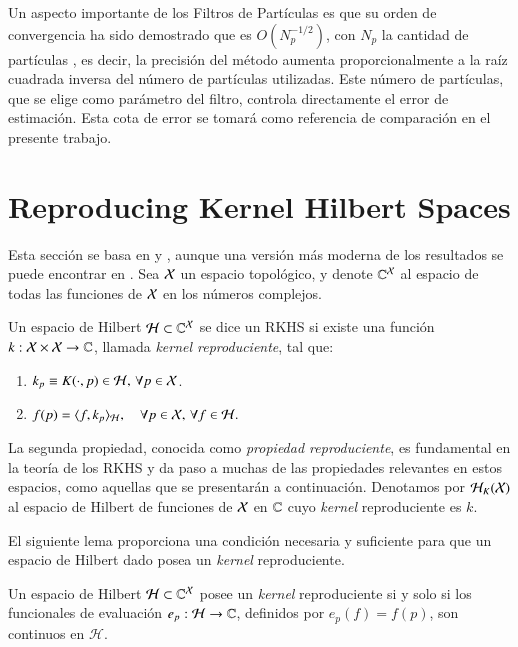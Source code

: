 Un aspecto importante de los Filtros de Partículas es que su orden de convergencia ha sido demostrado que es $O(N_p^{-1/2})$, con $N_p$ la cantidad de partículas \cite{Crisan2002APractitioners, Chopin2020AnCarlo}, es decir, la precisión del método aumenta proporcionalmente a la raíz cuadrada inversa del número de partículas utilizadas. Este número de partículas, que se elige como parámetro del filtro, controla directamente el error de estimación. Esta cota de error se tomará como referencia de comparación en el presente trabajo.

\section{Reproducing Kernel Hilbert Spaces}
Esta sección se basa en \cite{Wendland2004ScatteredApproximation} y \cite{Berlinet2004ReproducingStatistics}, aunque una versión más moderna de los resultados se puede encontrar en \cite{Saitoh2016TheoryApplications}. Sea \( \mathcal{X} \) un espacio topológico, y denote \(\mathbb{C}^{\mathcal{X}}\) al espacio de todas las funciones de \( \mathcal{X} \) en los números complejos. 

\begin{defn}  
Un espacio de Hilbert \( \mathcal{H} \subset \mathbb{C}^{\mathcal{X}} \) se dice un RKHS si existe una función \( k: \mathcal{X} \times \mathcal{X} \to \mathbb{C} \), llamada \textit{kernel reproduciente}, tal que:
\begin{enumerate}
    \item \( k_p \equiv K(\cdot, p) \in \mathcal{H}, \, \forall p \in \mathcal{X} \).
    \item \( f(p) = \langle f, k_p \rangle_{\mathcal{H}}, \quad \forall p \in \mathcal{X}, \, \forall f \in \mathcal{H}. \)
\end{enumerate}
\end{defn}

\noindent La segunda propiedad, conocida como \textit{propiedad reproduciente}, es fundamental en la teoría de los RKHS y da paso a muchas de las propiedades relevantes en estos espacios, como aquellas que se presentarán a continuación. Denotamos por \( \mathcal{H}_K(\mathcal{X}) \) al espacio de Hilbert de funciones de \( \mathcal{X} \) en \( \mathbb{C} \) cuyo \textit{kernel} reproduciente es \( k \).

El siguiente lema proporciona una condición necesaria y suficiente para que un espacio de Hilbert dado posea un \textit{kernel} reproduciente.

\begin{lema}
Un espacio de Hilbert \( \mathcal{H} \subset \mathbb{C}^{\mathcal{X}} \) posee un \textit{kernel} reproduciente si y solo si los funcionales de evaluación \( e_p: \mathcal{H} \to \mathbb{C} \), definidos por \( e_p(f) = f(p) \), son continuos en \( \mathcal{H} \).
\end{lema}

